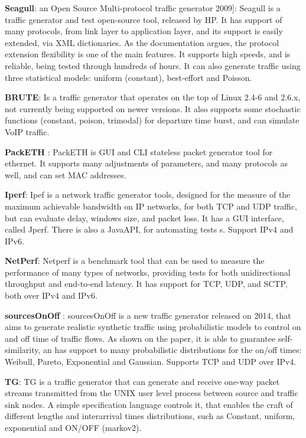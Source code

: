 \textbf{Seagull}\cite{wp-seagull}\cite{web-seagull}: an Open Source Multi-protocol traffic generator 2009]: Seagull is a traffic generator and test open-source tool, released by HP. 
It has support of many protocols, from link layer to application layer, and its support is easily extended, via XML dictionaries. As the documentation argues, the protocol extension flexibility is one of the main features. It supports high speeds, and is reliable, being tested through hundreds of hours. 
It can also generate traffic using three statistical models: uniform (constant), best-effort and Poisson. 


\textbf{BRUTE}\cite{web-brute}: Is a traffic generator that operates on the top of Linux 2.4-6 and 2.6.x, not currently being supported on newer versions. It also supports some stochastic functions (constant, poison, trimodal) for departure time burst, and can simulate VoIP traffic.


\textbf{PackETH} \cite{web-packeth}: PackETH is GUI and CLI stateless packet generator tool for ethernet. It supports many adjustments of parameters, and many protocols as well, and can set MAC addresses.  

\textbf{Iperf}\cite{web-iperf}: Ipef is a network traffic generator tools, designed for the measure of the maximum achievable bandwidth on IP networks, for both TCP and UDP traffic, but can evaluate delay, windows size, and packet loss. It has a GUI interface, called Jperf\cite{web-jperf}. There is also a JavaAPI, for automating tests s\cite{jperf-git}. Support IPv4 and IPv6.


\textbf{NetPerf}\cite{web-netperf}: Netperf is a benchmark tool that can be used to measure the performance of many types of networks, providing tests for both unidirectional throughput and end-to-end latency. It has support for TCP, UDP, and \acrshort{SCTP}, both over IPv4 and IPv6. 


\textbf{sourcesOnOff}\cite{sourcesonoff-paper} \cite{web-sourcesonoff}:  sourcesOnOff is a new traffic generator released on 2014, that aims to generate realistic synthetic traffic using probabilistic models to control on and off time of traffic flows. As shown on the paper, it is able to guarantee self-similarity, an has support to many probabilistic distributions for the on/off times: Weibull, Pareto, Exponential and Gaussian. Supports TCP and UDP over IPv4.


\textbf{TG}\cite{web-tg}: TG is a traffic generator that can generate and receive one-way packet streams transmitted from the UNIX user level process between source and traffic sink nodes. A simple specification language controls it, that enables the craft of different lengths and interarrival times distributions, such as Constant, uniform, exponential and ON/OFF (markov2). 

